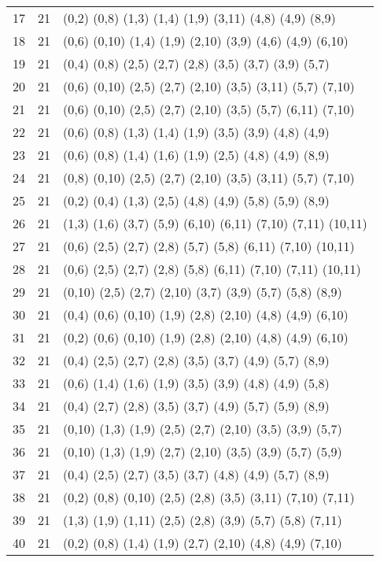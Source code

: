 {\begin{longtable}{lll}
17  & 21 & (0,2) (0,8) (1,3) (1,4) (1,9) (3,11) (4,8) (4,9) (8,9) \\
18  & 21 & (0,6) (0,10) (1,4) (1,9) (2,10) (3,9) (4,6) (4,9) (6,10) \\
19  & 21 & (0,4) (0,8) (2,5) (2,7) (2,8) (3,5) (3,7) (3,9) (5,7) \\
20  & 21 & (0,6) (0,10) (2,5) (2,7) (2,10) (3,5) (3,11) (5,7) (7,10) \\
21  & 21 & (0,6) (0,10) (2,5) (2,7) (2,10) (3,5) (5,7) (6,11) (7,10) \\
22  & 21 & (0,6) (0,8) (1,3) (1,4) (1,9) (3,5) (3,9) (4,8) (4,9) \\
23  & 21 & (0,6) (0,8) (1,4) (1,6) (1,9) (2,5) (4,8) (4,9) (8,9) \\
24  & 21 & (0,8) (0,10) (2,5) (2,7) (2,10) (3,5) (3,11) (5,7) (7,10) \\
25  & 21 & (0,2) (0,4) (1,3) (2,5) (4,8) (4,9) (5,8) (5,9) (8,9) \\
26  & 21 & (1,3) (1,6) (3,7) (5,9) (6,10) (6,11) (7,10) (7,11) (10,11) \\
27  & 21 & (0,6) (2,5) (2,7) (2,8) (5,7) (5,8) (6,11) (7,10) (10,11) \\
28  & 21 & (0,6) (2,5) (2,7) (2,8) (5,8) (6,11) (7,10) (7,11) (10,11) \\
29  & 21 & (0,10) (2,5) (2,7) (2,10) (3,7) (3,9) (5,7) (5,8) (8,9) \\
30  & 21 & (0,4) (0,6) (0,10) (1,9) (2,8) (2,10) (4,8) (4,9) (6,10) \\
31  & 21 & (0,2) (0,6) (0,10) (1,9) (2,8) (2,10) (4,8) (4,9) (6,10) \\
32  & 21 & (0,4) (2,5) (2,7) (2,8) (3,5) (3,7) (4,9) (5,7) (8,9) \\
33  & 21 & (0,6) (1,4) (1,6) (1,9) (3,5) (3,9) (4,8) (4,9) (5,8) \\
34  & 21 & (0,4) (2,7) (2,8) (3,5) (3,7) (4,9) (5,7) (5,9) (8,9) \\
35  & 21 & (0,10) (1,3) (1,9) (2,5) (2,7) (2,10) (3,5) (3,9) (5,7) \\
36  & 21 & (0,10) (1,3) (1,9) (2,7) (2,10) (3,5) (3,9) (5,7) (5,9) \\
37  & 21 & (0,4) (2,5) (2,7) (3,5) (3,7) (4,8) (4,9) (5,7) (8,9) \\
38  & 21 & (0,2) (0,8) (0,10) (2,5) (2,8) (3,5) (3,11) (7,10) (7,11) \\
39  & 21 & (1,3) (1,9) (1,11) (2,5) (2,8) (3,9) (5,7) (5,8) (7,11) \\
40  & 21 & (0,2) (0,8) (1,4) (1,9) (2,7) (2,10) (4,8) (4,9) (7,10) \\

\end{longtable}}
